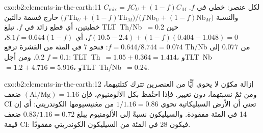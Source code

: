\begin{solution}{exo:b2:elements-in-the-earth:11}
$C_{\mathrm{mix}} = fC_U + (1-f)C_M$ لكل عنصر: خطي في $f$. والنسبة
$\bigl(f\,\mathrm{Th}_U + (1-f)\mathrm{Th}_M\bigr)/\bigl(f\,\mathrm{Nb}_U +
(1-f)\mathrm{Nb}_M\bigr)$ خارج قسمة دالتين خطيتين، أي قطع زائد في $f$.
تبلغ \mbox{\textdir TLT Th/Nb $= 0.2$} حين $f(10.5-2.4) + (1-f)(0.404-1.048) = 0$، أي $8.1f = 0.644(1-f)$،
$f = 0.644/8.744 = 0.074$: فنحو 7 في المئة من القشرة ترفع Th/Nb من 0.077 إلى 0.2. ومن أجل
$f = 0.1$: \mbox{\textdir TLT Th $= 1.05 + 0.364 = 1.414$}، و\mbox{\textdir TLT Nb $= 1.2 + 4.716 = 5.916$}، و\mbox{\textdir TLT Th/Nb $= 0.24$}.
\end{solution}

\begin{solution}{exo:b2:elements-in-the-earth:12}
إزالة مكوّن لا يحوي أيًّا من العنصرين تترك كتلتيهما، ومن ثمّ نسبتهما،
دون تغيير. فإذا احتُفظ بكل الألومنيوم، فإن $(\mathrm{Al}/\mathrm{Mg}) = 1.16$ ضعف CI
تعني أن الأرض السيليكاتية تحوي $1/1.16 = 0.86$ من مغنيسيومها الكوندريتي: أي إن 14 في
المئة مفقودة. والسيليكون نسبةً إلى الألومنيوم يبلغ $0.83/1.16 = 0.72$ ضعف قيمة CI:
فيكون 28 في المئة من السيليكون الكوندريتي مفقودًا.
\end{solution}

